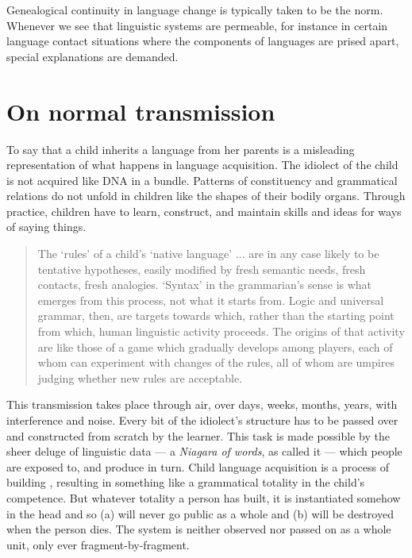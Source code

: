 Genealogical continuity in language change is typically taken to be the 
norm. Whenever we see that linguistic systems are permeable, for instance in certain language contact situations where the 
components of languages are prised apart, special explanations are 
demanded. 

\section{On normal transmission}

To say that a child inherits a language from her parents is a misleading representation of what happens in language acquisition. The idiolect of the child is not acquired like DNA in a bundle. Patterns of constituency and grammatical relations do not unfold in children like the shapes of their bodily organs. Through practice, children have to learn, construct, and maintain skills and ideas for ways of saying things. 

\begin{quotation}
The \textquoteleft rules' of a child's \textquoteleft native language' ... are in any case likely to be tentative hypotheses, easily modified by fresh semantic needs, fresh contacts, fresh analogies. \textquoteleft Syntax' in the grammarian's sense is what emerges from this process, not what it starts from. \citep[190]{le_page_acts_1985} Logic and universal grammar, then, are targets towards which, rather than the starting point from which, human linguistic activity proceeds. The origins of that activity are like those of a game which gradually develops among players, each of whom can experiment with changes of the rules, all of whom are umpires judging whether new rules are acceptable. \citep[197]{le_page_acts_1985} 
\end{quotation}

This transmission takes place through air, over days, weeks, months, years, with interference and noise. Every bit of the idiolect's structure has to be passed over and constructed from scratch by the learner. This task is made possible by the sheer deluge of linguistic data --- a \textit{Niagara of words}, as \citet[12ff]{hayakawa_language_1978} called it --- which people are exposed to, and produce in turn. Child language acquisition is a process of building \citep{tomasello_constructing_2003}, resulting in something like a grammatical totality in the child's competence. But whatever totality a person has built, it is instantiated somehow in the head and so (a) will never go public as a whole and (b) will be destroyed when the person dies. The system is neither observed nor passed on as a whole unit, only ever fragment-by-fragment.

